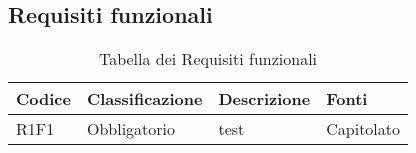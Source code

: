 \subsection{Requisiti funzionali} 


{


\centering
\renewcommand{\arraystretch}{2}
\begin{longtable}{C{2.5cm} C{2.8cm} C{6.7cm} C{2.5cm}}
\caption{Tabella dei Requisiti funzionali}\\
\textbf{Codice} &
\textbf{Classificazione}&
\textbf{Descrizione}&
\textbf{Fonti}\\
\endhead


R1F1 & Obbligatorio & test & Capitolato \\

\end{longtable}

}
